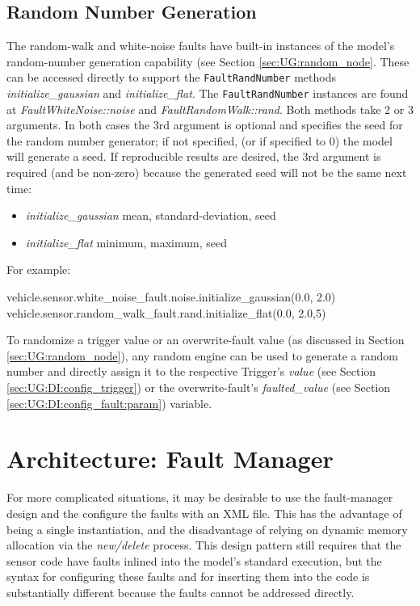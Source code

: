 \documentclass[11pt,fleqn]{report}
\begin{document}
\subsection {Random Number Generation}
The random-walk and white-noise faults have built-in instances of the model's
random-number generation capability (see Section \ref{sec:UG:random_node}.
These can be accessed directly to support
the \verb'FaultRandNumber' methods \textit{initialize\_gaussian} and
\textit{initialize\_flat}. The \verb'FaultRandNumber' instances are found at
\textit{FaultWhiteNoise::noise} and \textit{FaultRandomWalk::rand}. Both
methods take 2 or 3 arguments. In both cases the 3rd argument is optional
and specifies the seed for the random number generator; if not specified,
(or if specified to 0) the model will generate a seed.
If reproducible results are desired, the 3rd
argument is required (and be non-zero) because the generated seed will not
be the same next time:
\begin{itemize}
\item \textit{initialize\_gaussian} {mean, standard-deviation, seed}
\item \textit{initialize\_flat} {minimum, maximum, seed}
\end{itemize}
For example:
\begin{codePython}
vehicle.sensor.white_noise_fault.noise.initialize_gaussian(0.0, 2.0)
vehicle.sensor.random_walk_fault.rand.initialize_flat(0.0, 2.0,5)
\end{codePython}

To randomize a trigger value or an overwrite-fault value (as discussed in
Section \ref{sec:UG:random_node}), any random engine
can be used to generate a random number and directly assign it to the
respective
Trigger's \textit{value} (see Section \ref{sec:UG:DI:config_trigger}) or the
overwrite-fault's \textit{faulted\_value} (see Section
\ref{sec:UG:DI:config_fault:param}) variable.


\section{Architecture: Fault Manager} \label{sec:UG:FaultManager}
For more complicated situations, it may be desirable to use the fault-manager
design and the configure the faults with an XML file. This has the advantage of
being a single instantiation, and the disadvantage of relying on dynamic memory
allocation via the \textit{new/delete} process.
This design pattern still requires that the sensor code have faults inlined into
the model's standard execution, but the syntax for configuring these faults
and for inserting them into the code
is substantially different because the faults cannot be addressed directly.
\end{document}
